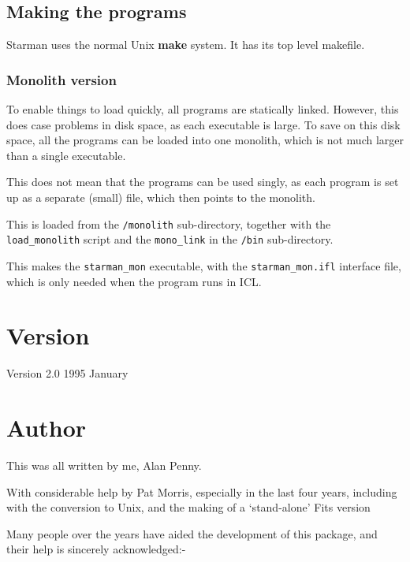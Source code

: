\subsection{Making the programs}

Starman uses the normal Unix {\bf make} system. It has its top level
makefile.

\subsubsection{Monolith version}

To enable things to load quickly, all programs are statically linked.
However, this does case problems in disk space, as each executable is
large.  To save on this disk space, all the programs can be loaded into
one monolith, which is not much larger than a single executable.

This does not mean that the programs can be used singly, as each
program is set up as a separate (small) file, which then points to the
monolith.

This is loaded from the \verb|/monolith| sub-directory, together with
the \verb|load_monolith| script and the \verb|mono_link| in the
\verb|/bin| sub-directory.

This makes the \verb|starman_mon| executable, with the
\verb|starman_mon.ifl| interface file, which is only needed when the
program runs in ICL.






\section{Version} 

  Version 2.0       \hspace*{20mm} 1995 January


\section{Author} 

  This was all written by me, Alan Penny.

  With considerable help by Pat Morris, especially in the last four
  years, including with the conversion to Unix, and the making of a
  `stand-alone' Fits version

  Many people over the years have aided the development of this package, 
  and their help is sincerely acknowledged:-

